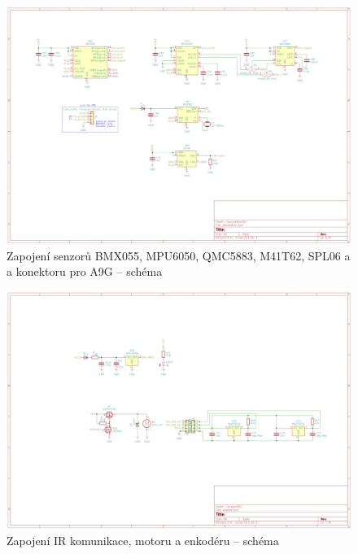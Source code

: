 \begin{figure}[htbp]
    \centering
    \includegraphics[width=0.93\textheight, angle=90]{kapitoly/ctvrta_elektronicka_varianta/E4_zapojeni/senzorika.pdf}
    \caption{Zapojení senzorů BMX055, MPU6050, QMC5883, M41T62, SPL06 a a konektoru pro A9G -- schéma \centering}
    \label{fig:E4-sch_senzorika}
\end{figure}
\begin{figure}[htbp]
    \centering
    \includegraphics[width=0.93\textheight, angle=90]{kapitoly/ctvrta_elektronicka_varianta/E4_zapojeni/IR_motor_enkoder.pdf}
    \caption{Zapojení IR komunikace, motoru a enkodéru -- schéma}
    \label{fig:E4-sch_IR-Motor-enkoder}
\end{figure}
